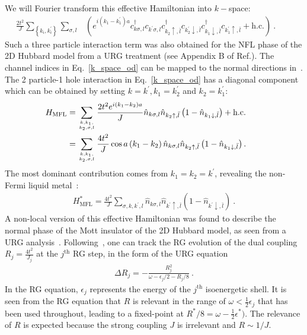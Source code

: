 \documentclass[reprint,hidelinks,onecolumn]{revtex4-2}
\begin{document}
We will Fourier transform this effective Hamiltonian into \(k-\)space:
\begin{eqnarray}
	\label{k_space_od}
	\frac{2t^2}{J}\sum_{\left\{k_i,k_i^\prime\right\}}\sum_{\sigma, l} &\left(e^{i\left(k_1 - k_1^\prime\right)a}c^\dagger_{k\sigma,l}c_{k^\prime\sigma,l}c^\dagger_{k_2 \uparrow, \bar l}c_{k_2^\prime \downarrow,\bar l}c^\dagger_{k_1 \downarrow,\bar l}c_{k_1^\prime \uparrow, \bar l} + \mathrm{h.c.}\right) ~.\qquad
\end{eqnarray}
Such a three particle interaction term was also obtained for the NFL phase of the 2D Hubbard model from a URG treatment (see Appendix B of Ref.\cite{anirbanmott1}). The channel indices in Eq.~\ref{k_space_od} can be mapped to the normal directions in~\cite{anirbanmott1}. The 2 particle-1 hole interaction in Eq.~\ref{k_space_od} has a diagonal component which can be obtained by setting \(k=k^\prime, k_1 = k_2^\prime\) and \(k_2 = k_1^\prime\):
\begin{eqnarray}
	H_\mathrm{MFL} &= \sum_{k, k_1, \atop{k_2,\sigma,  l}} \frac{2t^2e^{i\left(k_1 - k_2\right)a}}{J} \hat n_{k\sigma,l} \hat n_{k_2 \uparrow, \bar l}\left(1 - \hat n_{k_1 \downarrow,\bar l}\right) + \mathrm{h.c.}\nonumber\\
	&= \sum_{k, k_1, \atop{k_2,\sigma,  l}} \frac{4t^2}{J} \cos a\left(k_1 - k_2\right)  \hat n_{k\sigma,l} \hat n_{k_2 \uparrow, \bar l}\left(1 - \hat n_{k_1 \downarrow,\bar l}\right).\qquad 
\end{eqnarray}
The most dominant contribution comes from \(k_1 = k_2 = k^\prime\), revealing the non-Fermi liquid metal~\cite{cox_jarrell_two_channel_rev,Andrei1995}:
\begin{eqnarray}
	\label{mfl_large}
	H^*_\mathrm{MFL} = \frac{4t^2}{J} \sum_{\sigma, k, k^\prime, l} \hat n_{k\sigma,l} \hat n_{k^\prime \uparrow, \bar l}\left(1 - \hat n_{k^\prime \downarrow,\bar l}\right)~.
\end{eqnarray}
A non-local version of this effective Hamiltonian was found to describe the normal phase of the Mott insulator of the 2D Hubbard model, as seen from a URG analysis~\cite{anirbanmott1,anirbanmott2}. Following~\cite{anirbanmott1}, one can track the RG evolution of the dual coupling \(R_j = \frac{4t^2}{J_j}\) at the \(j^\mathrm{th}\) RG step, in the form of the URG equation
\begin{eqnarray}
	\Delta R_j =- \frac{R_j^2}{\omega - \epsilon_{j}/2 - R_j/8}~.
\end{eqnarray}
In the RG equation, \(\epsilon_{j}\) represents the energy of the \(j^\mathrm{th}\) isoenergetic shell. It is seen from 
the RG equation that \(R\) is relevant in the range of \(\omega < \frac{1}{2}\epsilon_j\) that has been used throughout, leading to a fixed-point at \(R^*/8 = \omega - \frac{1}{2}\epsilon^*)\). The relevance of \(R\) is expected because the strong coupling \(J\) is irrelevant and \(R \sim 1/J\).
\end{document}
